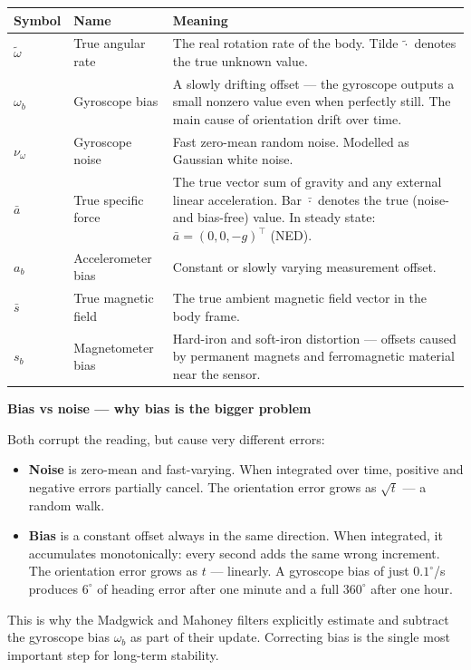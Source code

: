 \documentclass[12pt, a4paper]{article}
\begin{document}
\begin{center}
\begin{tabular}{@{} l p{3.0cm} p{7.4cm} @{}}
  \toprule
  Symbol & Name & Meaning \\
  \midrule
  $\tilde{\omega}$ & True angular rate &
    The real rotation rate of the body.
    Tilde $\tilde{\cdot}$ denotes the true unknown value. \\[3pt]
  $\omega_b$ & Gyroscope bias &
    A slowly drifting offset --- the gyroscope outputs a small nonzero
    value even when perfectly still.
    The main cause of orientation drift over time. \\[3pt]
  $\nu_\omega$ & Gyroscope noise &
    Fast zero-mean random noise.
    Modelled as Gaussian white noise. \\[3pt]
  $\bar{a}$ & True specific force &
    The true vector sum of gravity and any external linear acceleration.
    Bar $\bar{\cdot}$ denotes the true (noise- and bias-free) value.
    In steady state: $\bar{a} = (0,0,-g)^\top$ (NED). \\[3pt]
  $a_b$ & Accelerometer bias &
    Constant or slowly varying measurement offset. \\[3pt]
  $\bar{s}$ & True magnetic field &
    The true ambient magnetic field vector in the body frame. \\[3pt]
  $s_b$ & Magnetometer bias &
    Hard-iron and soft-iron distortion --- offsets caused by permanent
    magnets and ferromagnetic material near the sensor. \\
  \bottomrule
\end{tabular}
\end{center}

\begin{notebox}
  \textbf{Bias vs noise --- why bias is the bigger problem}

  Both corrupt the reading, but cause very different errors:

  \begin{itemize}[leftmargin=1.2em, itemsep=3pt]
    \item \textbf{Noise} is zero-mean and fast-varying.
      When integrated over time, positive and negative errors partially
      cancel.
      The orientation error grows as $\sqrt{t}$ --- a random walk.

    \item \textbf{Bias} is a constant offset always in the same direction.
      When integrated, it accumulates monotonically: every second adds the
      same wrong increment.
      The orientation error grows as $t$ --- linearly.
      A gyroscope bias of just $0.1^\circ$/s produces $6^\circ$ of heading
      error after one minute and a full $360^\circ$ after one hour.
  \end{itemize}

  This is why the Madgwick and Mahoney filters explicitly estimate and
  subtract the gyroscope bias $\omega_b$ as part of their update.
  Correcting bias is the single most important step for long-term stability.
\end{notebox}
\end{document}
